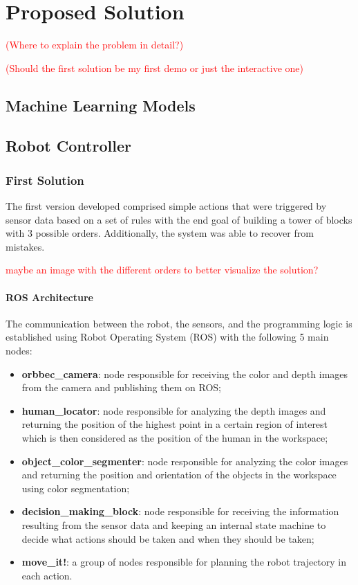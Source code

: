 \chapter{Proposed Solution}
\label{chapter:proposed_solution}

\textcolor{red}{(Where to explain the problem in detail?)}

\textcolor{red}{(Should the first solution be my first demo or just the interactive one)}

\section{Machine Learning Models}

\section{Robot Controller}

\subsection{First Solution}

The first version developed comprised simple actions that were triggered by sensor data based on a set of rules with the end goal of building a tower of blocks with 3 possible orders. Additionally, the system was able to recover from mistakes.

\textcolor{red}{maybe an image with the different orders to better visualize the solution?}

\subsubsection{ROS Architecture}

The communication between the robot, the sensors, and the programming logic is established using Robot Operating System (ROS) with the following 5 main nodes:

\begin{itemize}
    \item \textbf{orbbec\_camera}: node responsible for receiving the color and depth images from the camera and publishing them on ROS;
    \item \textbf{human\_locator}: node responsible for analyzing the depth images and returning the position of the highest point in a certain region of interest which is then considered as the position of the human in the workspace;
    \item \textbf{object\_color\_segmenter}: node responsible for analyzing the color images and returning the position and orientation of the objects in the workspace using color segmentation;
    \item \textbf{decision\_making\_block}: node responsible for receiving the information resulting from the sensor data and keeping an internal state machine to decide what actions should be taken and when they should be taken;
    \item \textbf{move\_it!}: a group of nodes responsible for planning the robot trajectory in each action.
\end{itemize}

